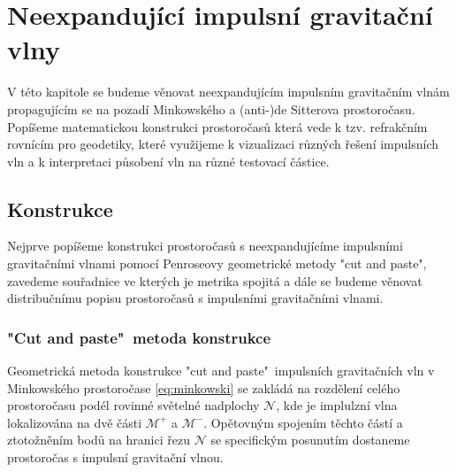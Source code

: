 \chapter{Neexpandující impulsní gravitační vlny}
V této kapitole se budeme věnovat neexpandujícím impulsním gravitačním vlnám propagujícím se na pozadí Minkowského a (anti-)de Sitterova
prostoročasu. Popíšeme matematickou konstrukci prostoročasů která vede k tzv. refrakčním rovnícím pro geodetiky, které využijeme k vizualizaci různých
řešení impulsních vln a k interpretaci působení vln na různé testovací částice.


\section{Konstrukce}
Nejprve popíšeme konstrukci prostoročasů s neexpandujícíme impulsními gravitačními vlnami
pomocí Penroseovy geometrické metody \cite{Penrose:1972xrn} "cut and paste", zavedeme souřadnice ve
kterých je metrika spojitá a dále se budeme věnovat distribučnímu popisu prostoročasů s impulsními gravitačními
vlnami.

\subsection{"Cut and paste"\ metoda konstrukce}
\label{sec:cut_and_paste_konstrukce1}
Geometrická metoda konstrukce "cut and paste"\ impulsních gravitačních vln v Minkowského prostoročase \eqref{eq:minkowski} se zakládá na rozdělení celého prostoročasu podél rovinné
světelné nadplochy $\mathcal{N}$, kde je implulzní vlna lokalizována na dvě části $\mathcal{M}^+$ a $\mathcal{M}^-$. Opětovným spojením těchto částí a ztotožněním bodů na hranici
řezu $\mathcal{N}$ se specifickým posunutím dostaneme prostoročas s impulsní gravitační vlnou.

